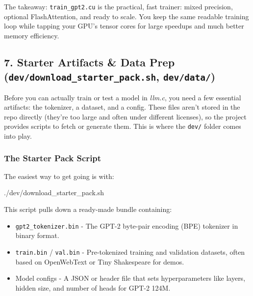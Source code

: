 \documentclass[
  letterpaper,
  DIV=11,
  numbers=noendperiod]{scrreprt}
\newenvironment{Shaded}{\begin{snugshade}}{\end{snugshade}}
\newcommand{\ExtensionTok}[1]{\textcolor[rgb]{0.00,0.23,0.31}{#1}}
\providecommand{\tightlist}{%
  \setlength{\itemsep}{0pt}\setlength{\parskip}{0pt}}
\begin{document}
The takeaway: \texttt{train\_gpt2.cu} is the practical, fast trainer:
mixed precision, optional FlashAttention, and ready to scale. You keep
the same readable training loop while tapping your GPU's tensor cores
for large speedups and much better memory efficiency.

\subsection{\texorpdfstring{7. Starter Artifacts \& Data Prep
(\texttt{dev/download\_starter\_pack.sh},
\texttt{dev/data/})}{7. Starter Artifacts \& Data Prep (dev/download\_starter\_pack.sh, dev/data/)}}\label{starter-artifacts-data-prep-devdownload_starter_pack.sh-devdata}

Before you can actually train or test a model in \emph{llm.c}, you need
a few essential artifacts: the tokenizer, a dataset, and a config. These
files aren't stored in the repo directly (they're too large and often
under different licenses), so the project provides scripts to fetch or
generate them. This is where the \texttt{dev/} folder comes into play.

\subsubsection{The Starter Pack Script}\label{the-starter-pack-script}

The easiest way to get going is with:

\begin{Shaded}
\begin{Highlighting}[]
\ExtensionTok{./dev/download\_starter\_pack.sh}
\end{Highlighting}
\end{Shaded}

This script pulls down a ready-made bundle containing:

\begin{itemize}
\tightlist
\item
  \texttt{gpt2\_tokenizer.bin} - The GPT-2 byte-pair encoding (BPE)
  tokenizer in binary format.
\item
  \texttt{train.bin} / \texttt{val.bin} - Pre-tokenized training and
  validation datasets, often based on OpenWebText or Tiny Shakespeare
  for demos.
\item
  Model configs - A JSON or header file that sets hyperparameters like
  layers, hidden size, and number of heads for GPT-2 124M.
\end{itemize}
\end{document}
